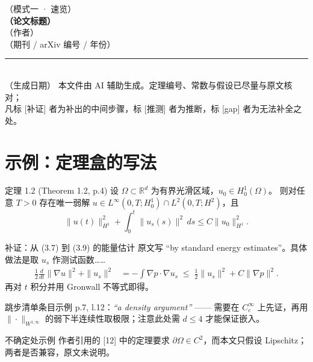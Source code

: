 \documentclass[11pt,UTF8,fontset=windows,a4paper]{ctexart}
\newcommand{\bz}{\textcolor{proofcolor}{[补证]}}
\newcommand{\ts}{\textcolor{warncolor}{[推测]}}
\newcommand{\gap}{\textcolor{gapcolor}{[gap]}}
\newcommand{\refo}[1]{\textsf{\small #1}}
\newcommand{\PaperTitle}{（论文标题）}
\newcommand{\PaperAuthors}{（作者）}
\newcommand{\PaperVenue}{（期刊 / arXiv 编号 / 年份）}
\newcommand{\NoteMode}{（模式一 · 速览）}
\newcommand{\NoteDate}{（生成日期）}
\begin{document}
\thispagestyle{empty}
\begin{center}
\vspace*{1.2cm}
{\footnotesize\color{gray}\NoteMode}\\[0.9cm]
{\LARGE\bfseries \PaperTitle}\\[0.5cm]
{\large \PaperAuthors}\\[0.3cm]
{\normalsize\color{notecolor}\PaperVenue}\\[1.0cm]
\rule{0.62\textwidth}{0.4pt}\\[0.35cm]
{\small \NoteDate}
\vfill
{\footnotesize\color{gray}
本文件由 AI 辅助生成。定理编号、常数与假设已尽量与原文核对；\\
凡标 \bz{} 者为补出的中间步骤，标 \ts{} 者为推断，标 \gap{} 者为无法补全之处。}
\end{center}
\newpage

\tableofcontents
\newpage


\section*{示例：定理盒的写法}

\begin{thmbox}{定理 1.2 \refo{(Theorem 1.2, p.4)}}
设 $\Omega\subset\mathbb{R}^d$ 为有界光滑区域，$u_0\in H^1_0(\Omega)$。
则对任意 $T>0$ 存在唯一弱解 $u\in L^\infty(0,T;H^1_0)\cap L^2(0,T;H^2)$，且
\begin{equation}
\|u(t)\|_{H^1}^2+\int_0^t\|u_s(s)\|^2\,ds\le C\|u_0\|_{H^1}^2 .
\end{equation}
\end{thmbox}

\begin{proofbox}{补证：从 (3.7) 到 (3.9) 的能量估计}
原文写 ``by standard energy estimates''。具体做法是取 $u_s$ 作测试函数……
\begin{align}
\tfrac12\frac{d}{dt}\|\nabla u\|^2+\|u_s\|^2
&= -\int \nabla p\cdot\nabla u_s \;\le\; \tfrac12\|u_s\|^2 + C\|\nabla p\|^2 .
\end{align}
再对 $t$ 积分并用 Gronwall 不等式即得。
\end{proofbox}

\begin{gapbox}{跳步清单条目示例}
\refo{p.7, l.12}：\emph{``a density argument''} —— 需要在 $C_c^\infty$ 上先证，再用 $\|\cdot\|_{W^{1,\infty}}$ 的弱下半连续性取极限；注意此处需 $d\le 4$ 才能保证嵌入。
\end{gapbox}

\begin{warnbox}{不确定处示例}
作者引用的 \refo{[12]} 中的定理要求 $\partial\Omega\in C^2$，而本文只假设 Lipschitz；两者是否兼容，原文未说明。
\end{warnbox}
\end{document}
